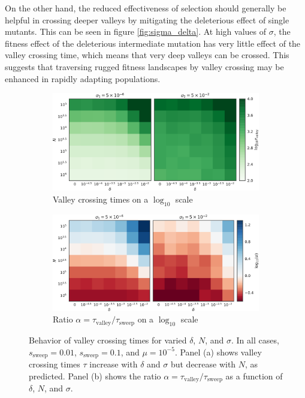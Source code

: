 \documentclass[rmp]{revtex4}
\begin{document}
\begin{spacing}{1.5}
On the other hand, the reduced effectiveness of selection should generally be helpful in crossing deeper valleys by mitigating the deleterious effect of single mutants.
This can be seen in figure \ref{fig:sigma_delta}.
At high values of $\sigma$, the fitness effect of the deleterious intermediate mutation has very little effect of the valley crossing time, which means that very deep valleys can be crossed.
This suggests that traversing rugged fitness landscapes by valley crossing may be enhanced in rapidly adapting populations.

\begin{figure}
\begin{subfigure}[b]{0.475\textwidth}
  \includegraphics[width=\textwidth]{Figures/tau_compare_crop.pdf}
  \caption{Valley crossing times on a $\log_{10}$ scale}
  \label{fig:tau}
\end{subfigure}
\begin{subfigure}[b]{0.475\textwidth}
  \includegraphics[width=\textwidth]{Figures/alpha_ratios_crop.pdf}
  \caption{Ratio $\alpha = \tau_{\mathrm{valley}}/\tau_{\mathrm{sweep}}$ on a $\log_{10}$ scale}
  \label{fig:ratios}
\end{subfigure}
\caption{Behavior of valley crossing times for varied $\delta$, $N$, and $\sigma$. In all cases, $s_{\mathrm{sweep}} = 0.01$, $s_{\mathrm{sweep}} = 0.1$, and $\mu = 10^{-5}$. Panel (a) shows valley crossing times $\tau$ increase with $\delta$ and $\sigma$ but decrease with $N$, as predicted. Panel (b) shows the ratio $\alpha = \tau_{\mathrm{valley}}/\tau_{\mathrm{sweep}}$ as a function of $\delta$, $N$, and $\sigma$.}
\label{fig:tau-ratios}
\end{figure}


\end{spacing}
\end{document}
